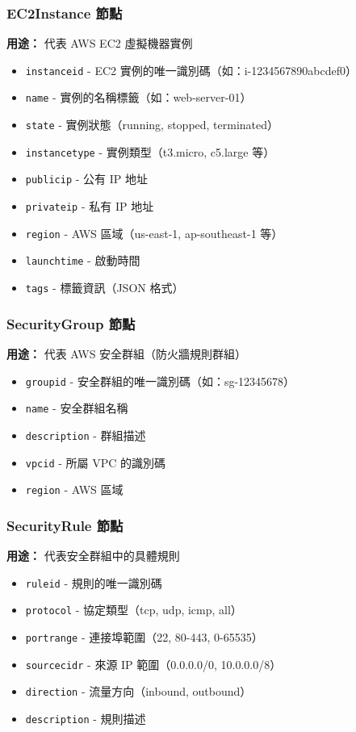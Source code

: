 \documentclass[11pt,a4paper]{ctexart}
\begin{document}
\subsubsection{EC2Instance 節點}
\textbf{用途：} 代表 AWS EC2 虛擬機器實例
\begin{itemize}[leftmargin=1.5em]
\item \texttt{instanceid} - EC2 實例的唯一識別碼（如：i-1234567890abcdef0）
\item \texttt{name} - 實例的名稱標籤（如：web-server-01）
\item \texttt{state} - 實例狀態（running, stopped, terminated）
\item \texttt{instancetype} - 實例類型（t3.micro, c5.large 等）
\item \texttt{publicip} - 公有 IP 地址
\item \texttt{privateip} - 私有 IP 地址
\item \texttt{region} - AWS 區域（us-east-1, ap-southeast-1 等）
\item \texttt{launchtime} - 啟動時間
\item \texttt{tags} - 標籤資訊（JSON 格式）
\end{itemize}

\subsubsection{SecurityGroup 節點}
\textbf{用途：} 代表 AWS 安全群組（防火牆規則群組）
\begin{itemize}[leftmargin=1.5em]
\item \texttt{groupid} - 安全群組的唯一識別碼（如：sg-12345678）
\item \texttt{name} - 安全群組名稱
\item \texttt{description} - 群組描述
\item \texttt{vpcid} - 所屬 VPC 的識別碼
\item \texttt{region} - AWS 區域
\end{itemize}

\subsubsection{SecurityRule 節點}
\textbf{用途：} 代表安全群組中的具體規則
\begin{itemize}[leftmargin=1.5em]
\item \texttt{ruleid} - 規則的唯一識別碼
\item \texttt{protocol} - 協定類型（tcp, udp, icmp, all）
\item \texttt{portrange} - 連接埠範圍（22, 80-443, 0-65535）
\item \texttt{sourcecidr} - 來源 IP 範圍（0.0.0.0/0, 10.0.0.0/8）
\item \texttt{direction} - 流量方向（inbound, outbound）
\item \texttt{description} - 規則描述
\end{itemize}
\end{document}
